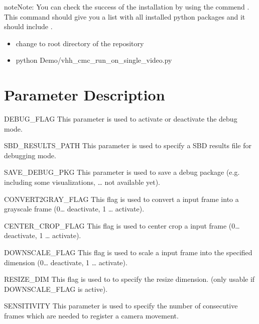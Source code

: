 \documentclass[letterpaper,10pt,english,openany,oneside]{sphinxmanual}
\begin{document}
\begin{sphinxadmonition}{note}{Note:}
You can check the success of the installation by using the commend . This command should give you a list
with all installed python packages and it should include .
\end{sphinxadmonition}

\begin{itemize}
\item {} 
change to root directory of the repository

\item {} 
python Demo/vhh\_cmc\_run\_on\_single\_video.py

\end{itemize}


\chapter{Parameter Description}
\label{\detokenize{index:parameter-description}}
DEBUG\_FLAG
This parameter is used to activate or deactivate the debug mode.



SBD\_RESULTS\_PATH
This parameter is used to specify a SBD results file for debugging mode.



SAVE\_DEBUG\_PKG
This parameter is used to save a debug package (e.g. including some visualizations, … \sphinxhyphen{} not available yet).



CONVERT2GRAY\_FLAG
This flag is used to convert a input frame into a grayscale frame (0… deactivate, 1 … activate).



CENTER\_CROP\_FLAG
This flag is used to center crop a input frame (0… deactivate, 1 … activate).



DOWNSCALE\_FLAG
This flag is used to scale a input frame into the specified dimension (0… deactivate, 1 … activate).



RESIZE\_DIM
This flag is used to to specify the resize dimension. (only usable if DOWNSCALE\_FLAG is active).



SENSITIVITY
This parameter is used to specify the number of consecutive frames which are needed to register a camera movement.
\end{document}
